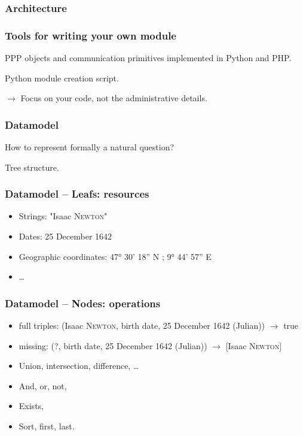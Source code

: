 \begin{frame}[fragile]
    \frametitle{Architecture}
    \begin{figure}
        \resizebox{.9\linewidth}{!}{
            
        }
    \end{figure}
\end{frame}

\begin{frame}[fragile]
    \frametitle{Tools for writing your own module}
    PPP objects and communication primitives implemented in Python and PHP.

    Python module creation script.

    $\rightarrow$ Focus on your code, not the administrative details.
\end{frame}

\begin{frame}[fragile]
    \frametitle{Datamodel}
    How to represent formally a natural question?

    Tree structure.
\end{frame}
\begin{frame}[fragile]
    \frametitle{Datamodel \--- Leafs: resources}
        \begin{itemize}
            \item Strings: "Isaac \textsc{Newton}"
            \item Dates: 25 December 1642
            \item Geographic coordinates: 47° 30' 18'' N ; 9° 44' 57'' E
            \item \ldots
        \end{itemize}
\end{frame}
\begin{frame}[fragile]
    \frametitle{Datamodel \--- Nodes: operations}
        \begin{itemize}
            \item full triples: (Isaac \textsc{Newton}, birth date, 25 December 1642 (Julian)) $\rightarrow$ true
            \item missing: (?, birth date, 25 December 1642 (Julian)) $\rightarrow$ [Isaac \textsc{Newton}]
            \item Union, intersection, difference, \ldots
            \item And, or, not,
            \item Exists,
            \item Sort, first, last.
        \end{itemize}
\end{frame}

